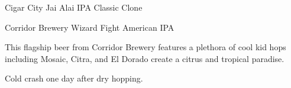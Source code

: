 \begin{recipie}{Cigar City Jai Alai IPA Classic Clone}
\begin{ingredientsblock}
\begin{yeasts}
\end{yeasts}

\end{ingredientsblock}

\end{recipie}

\begin{recipie}{Corridor Brewery Wizard Fight American IPA}

\begin{aboutblock}
This flagship beer from Corridor Brewery features a plethora of cool kid hops
including Mosaic, Citra, and El Dorado create a citrus and tropical paradise.
\end{aboutblock}


\begin{methodandtiming}
 
\begin{mashsteps}
\end{mashsteps}

\begin{fermentationsteps}
\end{fermentationsteps}

\begin{directions}
Cold crash one day after dry hopping.
\end{directions}

\end{methodandtiming}

\pagebreak

\begin{ingredientsblock}

\begin{malts}
\end{malts}

\begin{hops}
\end{hops}

\begin{yeasts}
\end{yeasts}

\end{ingredientsblock}

\end{recipie}

